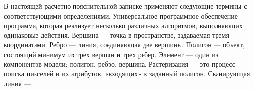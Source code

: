 

В настоящей расчетно-пояснительной записке применяют следующие термины с соответствующими определениями.\newline
\noindent
{
Универсальное программное обеспечение --- программа, которая реализует несколько различных алгоритмов, выполняющих одинаковые действия.\newline
Вершина --- точка в пространстве, задаваемая тремя координатами.\newline
Ребро --- линия, соединяющая две вершины.\newline
Полигон --- объект, состоящий минимум из трех вершин и трех ребер.\newline
Элемент --- один из компонентов модели: полигон, ребро, вершина.\newline
Растеризация --- это процесс поиска пикселей и их атрибутов, «входящих» в заданный полигон.\newline
Сканирующая линия ---
}